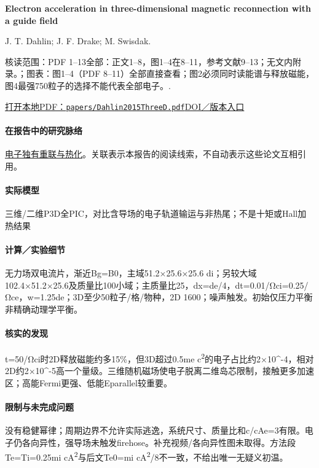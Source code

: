\documentclass[UTF8,a4paper,11pt,openany,fontset=fandol]{ctexbook}
\begin{document}
\textbf{Electron acceleration in three-dimensional magnetic reconnection with a guide field}\citep{Dahlin2015ThreeD}\

J. T. Dahlin;  J. F. Drake;  M. Swisdak.

\textsf{核读范围：}PDF 1–13全部：正文1–8，图1–4在8–11，参考文献9–13；无文内附录。；\textsf{图表：}图1–4（PDF 8–11）全部直接查看；图2必须同时读能谱与释放磁能，图4最强750粒子的选择不能代表全部电子。.

\href{run:../papers/Dahlin2015ThreeD.pdf}{打开本地PDF：\texttt{papers/Dahlin2015ThreeD.pdf}}\quad\href{https://doi.org/10.1063/1.4933212}{DOI／版本入口}

\paragraph{在报告中的研究脉络}\hyperref[story:energy]{电子独有重联与热化}。关联表示本报告的阅读线索，不自动表示这些论文互相引用。

\paragraph{实际模型}三维/二维P3D全PIC，对比含导场的电子轨道输运与非热尾；不是十矩或Hall加热结果

\paragraph{计算／实验细节}无力场双电流片，渐近Bg=B0，主域51.2×25.6×25.6 di；另较大域102.4×51.2×25.6及质量比100小域；主质量比25，dx=de/4，dt=0.01/Ωci=0.25/Ωce，w=1.25de；3D至少50粒子/格/物种，2D 1600；噪声触发。初始仅压力平衡非精确动理学平衡。

\paragraph{核实的发现}t=50/Ωci时2D释放磁能约多15\%，但3D超过0.5me c\textsuperscript{2}的电子占比约2×10\textasciicircum{}-4，相对2D约2×10\textasciicircum{}-5高一个量级。三维随机磁场使电子脱离二维岛芯限制，接触更多加速区；高能Fermi更强、低能Eparallel较重要。

\paragraph{限制与未完成问题}没有稳健幂律；周期边界不允许实际逃逸，系统尺寸、质量比和c/cAe=3有限。电子仍各向异性，强导场未触发firehose。补充视频/各向异性图未取得。方法段Te=Ti=0.25mi cA\textsuperscript{2}与后文Te0=mi cA\textsuperscript{2}/8不一致，不给出唯一无疑义初温。
\end{document}
